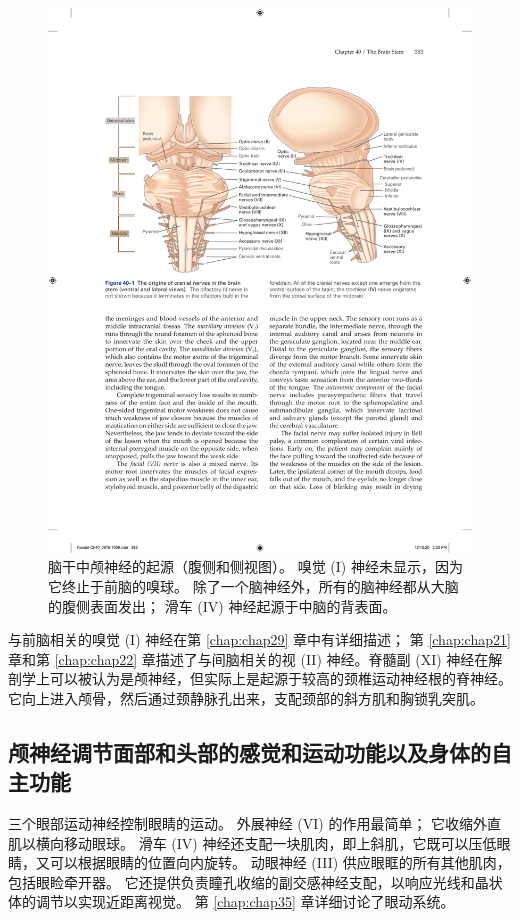 \begin{figure}[htbp]
	\centering
	\includegraphics[width=0.95\linewidth]{chap40/fig_40_1}
	\caption{脑干中颅神经的起源（腹侧和侧视图）。 嗅觉 (I) 神经未显示，因为它终止于前脑的嗅球。 除了一个脑神经外，所有的脑神经都从大脑的腹侧表面发出； 滑车 (IV) 神经起源于中脑的背表面。}
	\label{fig:40_1}
\end{figure}

与前脑相关的嗅觉 (I) 神经在第 \ref{chap:chap29} 章中有详细描述； 第 \ref{chap:chap21} 章和第 \ref{chap:chap22} 章描述了与间脑相关的视 (II) 神经。脊髓副 (XI) 神经在解剖学上可以被认为是颅神经，但实际上是起源于较高的颈椎运动神经根的脊神经。 它向上进入颅骨，然后通过颈静脉孔出来，支配颈部的斜方肌和胸锁乳突肌。

\subsection{颅神经调节面部和头部的感觉和运动功能以及身体的自主功能}

三个眼部运动神经控制眼睛的运动。 外展神经 (VI) 的作用最简单； 它收缩外直肌以横向移动眼球。 滑车 (IV) 神经还支配一块肌肉，即上斜肌，它既可以压低眼睛，又可以根据眼睛的位置向内旋转。 动眼神经 (III) 供应眼眶的所有其他肌肉，包括眼睑牵开器。 它还提供负责瞳孔收缩的副交感神经支配，以响应光线和晶状体的调节以实现近距离视觉。 第 \ref{chap:chap35} 章详细讨论了眼动系统。

